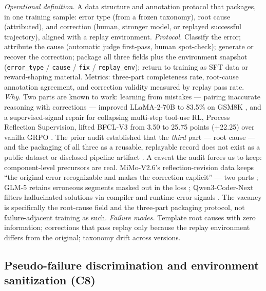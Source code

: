 \documentclass[10pt]{article}
\begin{document}
\emph{Operational definition.} A data structure and annotation protocol that packages, in one training sample: error type (from a frozen taxonomy), root cause (attributed), and correction (human, stronger model, or replayed successful trajectory), aligned with a replay environment. \emph{Protocol.} Classify the error; attribute the cause (automatic judge first-pass, human spot-check); generate or recover the correction; package all three fields plus the environment snapshot (\texttt{error\_type} / \texttt{cause} / \texttt{fix} / \texttt{replay\_env}); return to training as SFT data or reward-shaping material. Metrics: three-part completeness rate, root-cause annotation agreement, and correction validity measured by replay pass rate. \emph{Why.} Two parts are known to work: learning from mistakes --- pairing inaccurate reasoning with corrections --- improved LLaMA-2-70B to 83.5\% on GSM8K \cite{ref24}, and a supervised-signal repair for collapsing multi-step tool-use RL, Process Reflection Supervision, lifted BFCL-V3 from 3.50 to 25.75 points (+22.25) over vanilla GRPO \cite{ref25}. The prior audit established that the \emph{third} part --- root cause --- and the packaging of all three as a reusable, replayable record does not exist as a public dataset or disclosed pipeline artifact \cite{ref6}. A caveat the audit forces us to keep: component-level precursors are real. MiMo-V2.6's reflection-revision data keeps ``the original error recognizable and makes the correction explicit'' --- two parts \cite{ref26}; GLM-5 retains erroneous segments masked out in the loss \cite{ref27}; Qwen3-Coder-Next filters hallucinated solutions via compiler and runtime-error signals \cite{ref28}. The vacancy is specifically the root-cause field and the three-part packaging protocol, not failure-adjacent training as such. \emph{Failure modes.} Template root causes with zero information; corrections that pass replay only because the replay environment differs from the original; taxonomy drift across versions.

\subsection{Pseudo-failure discrimination and environment sanitization (C8)}
\end{document}

